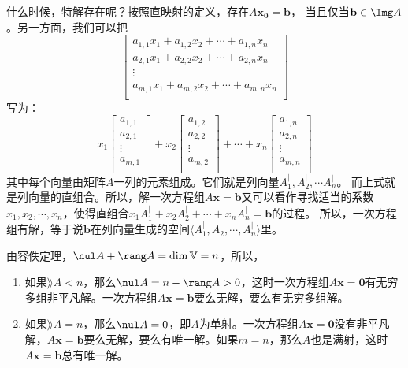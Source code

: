\documentclass[12pt,UTF8]{ctexbook}
\begin{document}
什么时候，特解存在呢？按照直映射的定义，存在$A\mathbf{x_0} = \mathbf{b}$，
当且仅当$\mathbf{b} \in \Img A$。另一方面，我们可以把
$$
    \begin{bmatrix}
        a_{1,1} x_1 + a_{1,2} x_2 + \cdots + a_{1,n} x_n \\
        a_{2,1} x_1 + a_{2,2} x_2 + \cdots + a_{2,n} x_n \\
        \vdots \\
        a_{m,1} x_1 + a_{m,2} x_2 + \cdots + a_{m,n} x_n \\
    \end{bmatrix}
$$
写为：
$$
    x_1 \begin{bmatrix}
        a_{1,1} \\
        a_{2,1} \\
        \vdots \\
        a_{m,1} \\
    \end{bmatrix} + x_2 \begin{bmatrix}
        a_{1,2} \\
        a_{2,2} \\
        \vdots \\
        a_{m,2}  \\
    \end{bmatrix} + \cdots + x_n \begin{bmatrix}
        a_{1,n} \\
        a_{2,n} \\
        \vdots \\
        a_{m,n}  \\
    \end{bmatrix}
$$
其中每个向量由矩阵$A$一列的元素组成。它们就是列向量$A_1^|, A_2^|, \cdots A_n^|$。
而上式就是列向量的直组合。所以，解一次方程组$A\mathbf{x} = \mathbf{b}$又可以看作寻找适当的系数
$x_1, x_2, \cdots , x_n$，使得直组合$x_1 A_1^| + x_2 A_2^| + \cdots + x_n A_n^| = \mathbf{b}$的过程。
所以，一次方程组有解，等于说$\mathbf{b}$在列向量生成的空间$\langle A_1^|, A_2^|, \cdots, A_n^| \rangle$里。

由容佚定理，$\nul A + \rang A = \dim \mathbb{V} = n$，所以，
\begin{enumerate}
    \item 如果$\rang A < n$，那么$\nul A = n - \rang A > 0$，这时一次方程组$A\mathbf{x} = \mathbf{0}$有无穷多组非平凡解。一次方程组$A\mathbf{x} = \mathbf{b}$要么无解，要么有无穷多组解。
    \item 如果$\rang A = n$，那么$\nul A = 0$，即$A$为单射。一次方程组$A\mathbf{x} = \mathbf{0}$没有非平凡解，$A\mathbf{x} = \mathbf{b}$要么无解，要么有唯一解。如果$m=n$，那么$A$也是满射，这时$A\mathbf{x} = \mathbf{b}$总有唯一解。
\end{enumerate}
\end{document}
